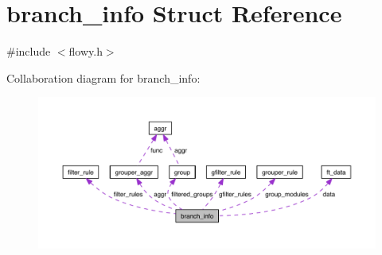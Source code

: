 \hypertarget{structbranch__info}{\section{branch\-\_\-info \-Struct \-Reference}
\label{structbranch__info}
}


{\ttfamily \#include $<$flowy.\-h$>$}



\-Collaboration diagram for branch\-\_\-info\-:
\nopagebreak
\begin{figure}[H]
\begin{center}
\leavevmode
\includegraphics[width=350pt]{structbranch__info__coll__graph}
\end{center}
\end{figure}
